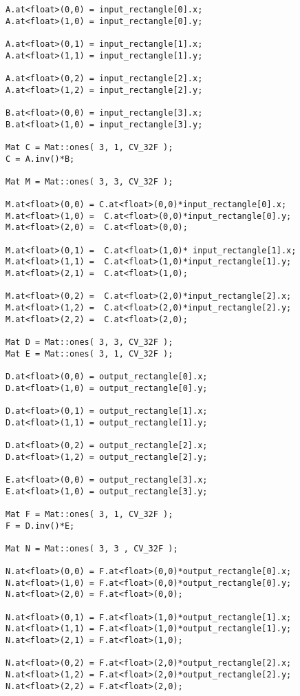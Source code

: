 \begin{lstlisting}
A.at<float>(0,0) = input_rectangle[0].x;
A.at<float>(1,0) = input_rectangle[0].y;

A.at<float>(0,1) = input_rectangle[1].x;
A.at<float>(1,1) = input_rectangle[1].y;

A.at<float>(0,2) = input_rectangle[2].x;
A.at<float>(1,2) = input_rectangle[2].y;

B.at<float>(0,0) = input_rectangle[3].x;
B.at<float>(1,0) = input_rectangle[3].y;

Mat C = Mat::ones( 3, 1, CV_32F );
C = A.inv()*B;

Mat M = Mat::ones( 3, 3, CV_32F );

M.at<float>(0,0) = C.at<float>(0,0)*input_rectangle[0].x;
M.at<float>(1,0) =  C.at<float>(0,0)*input_rectangle[0].y;
M.at<float>(2,0) =  C.at<float>(0,0);

M.at<float>(0,1) =  C.at<float>(1,0)* input_rectangle[1].x;
M.at<float>(1,1) =  C.at<float>(1,0)*input_rectangle[1].y;
M.at<float>(2,1) =  C.at<float>(1,0);

M.at<float>(0,2) =  C.at<float>(2,0)*input_rectangle[2].x;
M.at<float>(1,2) =  C.at<float>(2,0)*input_rectangle[2].y;
M.at<float>(2,2) =  C.at<float>(2,0);

Mat D = Mat::ones( 3, 3, CV_32F );
Mat E = Mat::ones( 3, 1, CV_32F );

D.at<float>(0,0) = output_rectangle[0].x;
D.at<float>(1,0) = output_rectangle[0].y;

D.at<float>(0,1) = output_rectangle[1].x;
D.at<float>(1,1) = output_rectangle[1].y;

D.at<float>(0,2) = output_rectangle[2].x;
D.at<float>(1,2) = output_rectangle[2].y;

E.at<float>(0,0) = output_rectangle[3].x;
E.at<float>(1,0) = output_rectangle[3].y;

Mat F = Mat::ones( 3, 1, CV_32F );
F = D.inv()*E;

Mat N = Mat::ones( 3, 3	, CV_32F );

N.at<float>(0,0) = F.at<float>(0,0)*output_rectangle[0].x;
N.at<float>(1,0) = F.at<float>(0,0)*output_rectangle[0].y;
N.at<float>(2,0) = F.at<float>(0,0);

N.at<float>(0,1) = F.at<float>(1,0)*output_rectangle[1].x;
N.at<float>(1,1) = F.at<float>(1,0)*output_rectangle[1].y;
N.at<float>(2,1) = F.at<float>(1,0);

N.at<float>(0,2) = F.at<float>(2,0)*output_rectangle[2].x;
N.at<float>(1,2) = F.at<float>(2,0)*output_rectangle[2].y;
N.at<float>(2,2) = F.at<float>(2,0);



\end{lstlisting}
